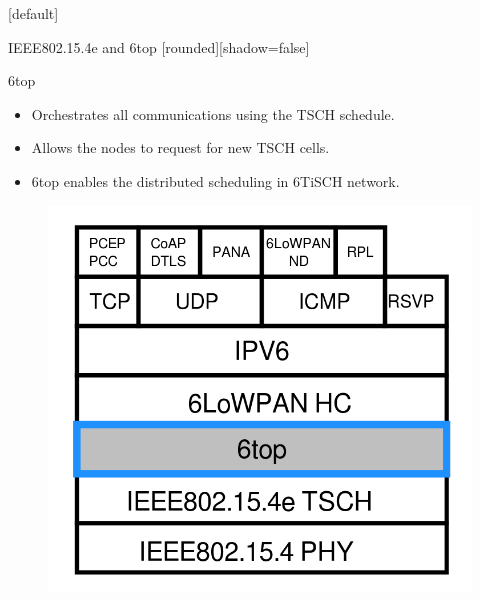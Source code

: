 \documentclass{beamer}
\makeatletter
\newenvironment{withoutheadline}{
        \setbeamertemplate{headline}[default]
        \def\beamer@entrycode{\vspace*{-\headheight}}
    }{}
\makeatother
\begin{document}
\begin{withoutheadline}
\begin{frame}{IEEE802.15.4e and 6top}
[rounded][shadow=false]


\begin{minipage}[t]{0.48\linewidth}

\begin{block}{6top}

    \begin{itemize}
    \item Orchestrates all communications using the TSCH schedule.
    \item<2-> Allows the nodes to request for new TSCH cells.
    \item<3-> 6top enables the distributed scheduling in 6TiSCH network.
    \end{itemize}
    \end{block}

\end{minipage}\hfill
\begin{minipage}[t]{0.48\linewidth}
\centering
\begin{figure}[p]

\includegraphics[width=\linewidth]{layers.png}
\end{figure}
\end{minipage}


\end{frame}
\end{withoutheadline}
\end{document}

